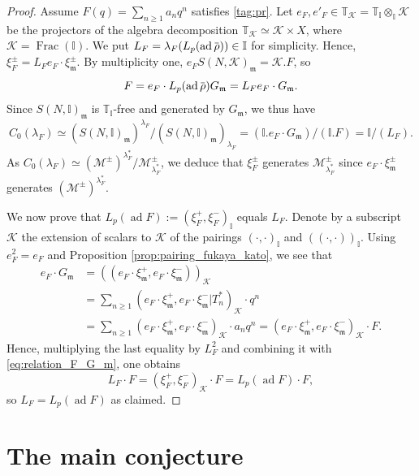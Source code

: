 \documentclass[12pt]{amsart}
\newcommand\bI{\mathbb{I}}
\newcommand\bT{\mathbb{T}}
\newcommand\cK{\mathcal{K}}
\newcommand\cM{\mathcal{M}}
\newcommand\gm{\mathfrak{m}}
\newcommand{\ob}[1]{\mkern 1.5mu\overline{\mkern-1.5mu#1\mkern-1.5mu}\mkern 1.5mu}
\DeclareMathOperator{\Frac}{Frac}
\DeclareMathOperator{\ad}{ad}
\theoremstyle{defstyle}
\theoremstyle{thmstyle}
\begin{document}
\begin{proof}
	Assume $F(q)=\sum_{n\geq 1}a_nq^n$ satisfies \eqref{tag:pr}. Let $e_F,e'_F\in\bT_\cK=\bT_\bI\otimes_\bI\cK$ be the projectors of the algebra decomposition $\bT_\cK\simeq\cK\times X$, where $\cK=\Frac(\bI)$. We put $L_F=\lambda_F(L_p(\ad \ob{\rho}))\in\bI$ for simplicity. Hence, $\xi_F^\pm= L_F e_F\cdot \xi^\pm_\gm$. By multiplicity one, $e_FS(N,\cK)_\gm=\cK.F$,  so
		\begin{equation}\label{eq:relation_F_G_m}
			F= e_F\cdot L_p(\ad \ob{\rho})G_\gm=L_F e_F\cdot G_\gm. 
		\end{equation}
		Since $S(N,\bI)_\gm$ is $\bT_\bI$-free and generated by $G_\gm$, we thus have 
		\[C_0(\lambda_F)\simeq (S(N,\bI)_\gm)^{\lambda_F}/(S(N,\bI)_\gm)_{\lambda_F}=(\bI.e_F\cdot G_\gm)/(\bI.F)=\bI/(L_F). \]
		As $C_0(\lambda_F)\simeq (\cM^\pm)^{\lambda_F^*}/\cM^\pm_{\lambda_F^*}$, we deduce that $\xi^\pm_F$ generates $\cM^\pm_{\lambda_F^*}$ since $e_F\cdot\xi^\pm_\gm$ generates $(\cM^\pm)^{\lambda_F^*}$.
		
		We now prove that $L_p(\ad F):=(\xi^+_F,\xi^-_F)_\bI$ equals $L_F$. Denote by a subscript $\cK$ the extension of scalars to $\cK$ of the pairings $(\cdot,\cdot)_\bI$ and $((\cdot,\cdot))_\bI$. Using $e_F^2=e_F$ and Proposition \ref{prop:pairing_fukaya_kato}, we see that 
		\begin{align*}
			e_F\cdot G_\gm &= ((e_F\cdot\xi_\gm^+,e_F\cdot\xi_\gm^-))_\cK \\
			&=\sum_{n\geq 1}(e_F\cdot \xi_\gm^+,e_F\cdot \xi_\gm^-|T_n^*)_\cK\cdot q^n \\
			&=\sum_{n\geq 1}(e_F\cdot \xi_\gm^+,e_F\cdot \xi_\gm^-)_\cK\cdot a_n q^n=(e_F\cdot \xi_\gm^+,e_F\cdot \xi_\gm^-)_\cK\cdot F.
		\end{align*}
		Hence, multiplying the last equality by $L_F^2$ and combining it with \eqref{eq:relation_F_G_m}, one obtains
		\[L_F\cdot F=(\xi^+_F,\xi^-_F)_\cK\cdot F = L_p(\ad F)\cdot F,\]
		so $L_F= L_p(\ad F)$ as claimed.
\end{proof}

\section{The main conjecture}\label{sec:section_3_main_conjecture}
\end{document}
